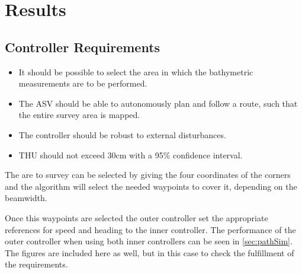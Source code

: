 \chapter{Results}\label{chap:results}

\section{Controller Requirements}
\begin{itemize}
    \item It should be possible to select the area in which the bathymetric measurements are to be performed.
    \item The ASV should be able to autonomously plan and follow a route, such that the entire survey area is mapped.
    \item The controller should be robust to external disturbances.
    \item THU should not exceed 30cm with a 95\% confidence interval.
\end{itemize}

The are to survey can be selected by giving the four coordinates of the corners and the algorithm will select the needed waypoints to cover it, depending on the beamwidth.

Once this waypoints are selected the outer controller set the appropriate references for speed and heading to the inner controller. The performance of the outer controller when using both inner controllers can be seen in \autoref{sec:pathSim}. The figures are included here as well, but in this case to check the fulfillment of the requirements.

